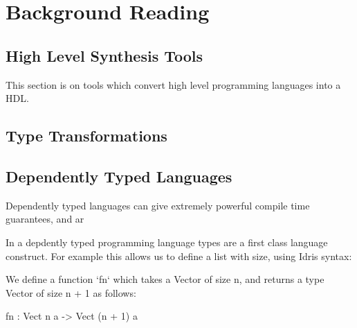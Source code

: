 \section{Background Reading}

\subsection{High Level Synthesis Tools}

This section is on tools which convert high level programming languages into a HDL.

%


\subsection{Type Transformations}


\subsection{Dependently Typed Languages}

Dependently typed languages can give extremely powerful compile time guarantees, and ar

In a depdently typed programming language types are a first class language construct.
For example this allows us to define a list with size, using Idris syntax: 



We define a function `fn` which takes a Vector of size
n, and returns a type Vector of size n + 1 as follows:

fn : Vect n a -> Vect (n + 1) a

